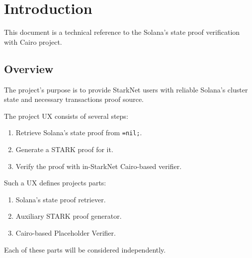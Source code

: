 \chapter{Introduction}

This document is a technical reference to the Solana's state proof verification
with Cairo project.

\section{Overview}

The project's purpose is to provide StarkNet users with reliable Solana's cluster 
state and necessary transactions proof source.

The project UX consists of several steps:
\begin{enumerate}
    \item Retrieve Solana's state proof from \texttt{=nil;}.
    \item Generate a STARK proof for it.
    \item Verify the proof with in-StarkNet Cairo-based verifier.
\end{enumerate}

Such a UX defines projects parts:
\begin{enumerate}
    \item Solana's state proof retriever.
    \item Auxiliary STARK proof generator.
    \item Cairo-based Placeholder Verifier.
\end{enumerate}

Each of these parts will be considered independently.
